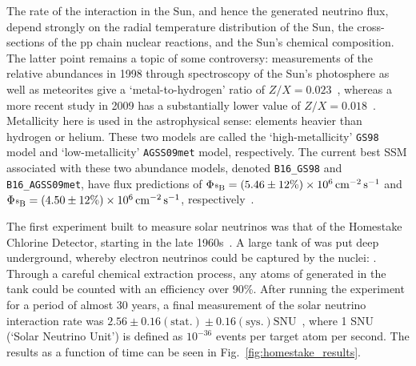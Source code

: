 The rate of the \beight{} interaction in the Sun, and hence the generated neutrino flux, depend strongly on the radial temperature distribution of the Sun, the cross-sections of the pp chain nuclear reactions, and the Sun's chemical composition. The latter point remains a topic of some controversy: measurements of the relative abundances in 1998 through spectroscopy of the Sun's photosphere as well as meteorites give a `metal-to-hydrogen' ratio of $Z/X = 0.023$~\cite{grevesseStandardSolarComposition1998}, whereas a more recent study in 2009 has a substantially lower value of $Z/X = 0.018$~\cite{asplundChemicalCompositionSun2009}. Metallicity here is used in the astrophysical sense: elements heavier than hydrogen or helium. These two models are called the `high-metallicity' \texttt{GS98} model and `low-metallicity' \texttt{AGSS09met} model, respectively. The current best SSM associated with these two abundance models, denoted \texttt{B16\_GS98} and \texttt{B16\_AGSS09met}, have \beight{} flux predictions of $\Phi_{\beight{}} = (5.46\pm12\%)\times 10^{6}\,\si{\per\cm\squared\per\second}$ and $\Phi_{\beight{}} = (4.50\pm12\%)\times 10^{6}\,\si{\per\cm\squared\per\second}$, respectively~\cite{vinyolesB16StandardSolar2018}.

The first experiment built to measure solar neutrinos was that of the Homestake Chlorine Detector, starting in the late 1960s~\cite{davisSearchNeutrinosSun1968}. A large tank of  was put deep underground, whereby electron neutrinos could be captured by the  nuclei: . Through a careful chemical extraction process, any atoms of  generated in the tank could be counted with an efficiency over 90\%. After running the experiment for a period of almost 30 years, a final measurement of the solar neutrino interaction rate was $2.56\pm0.16(\mathrm{stat.})\pm0.16(\mathrm{sys.})\mathrm{ SNU}$~\cite{clevelandMeasurementSolarElectron1998}, %
where 1 SNU (`Solar Neutrino Unit') is defined as $10^{-36}$ events per target atom per second. The results as a function of time can be seen in Fig.~\ref{fig:homestake_results}.

